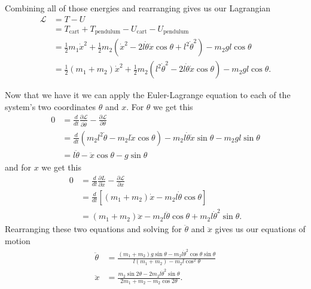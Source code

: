 \documentclass{article}
\begin{document}
Combining all of those energies and rearranging gives us our Lagrangian \begin{align*}
  \mathcal{L} & = T - U                                                                                                                                     \\
              & = T_\text{cart} + T_\text{pendulum} - U_\text{cart} - U_\text{pendulum}                                                                     \\
              & = \frac{1}{2} m_1 \dot{x}^2 + \frac{1}{2} m_2 (\dot{x}^2 - 2 l \dot{\theta} \dot{x} \cos \theta + l^2 \dot{\theta}^2) - m_2 g l \cos \theta \\
              & = \frac{1}{2} (m_1 + m_2) \dot{x}^2 + \frac{1}{2} m_2 (l^2 \dot{\theta}^2 - 2 l \dot{\theta} \dot{x} \cos \theta) - m_2 g l \cos \theta.
\end{align*}

Now that we have it we can apply the Euler-Lagrange equation to each of the system's two coordinates $\theta$ and $x$. For $\theta$ we get this \begin{align*}
  0 & = \frac{d}{d t} \frac{\partial \mathcal{L}}{\partial \dot{\theta}} - \frac{\partial \mathcal{L}}{\partial \theta}                 \\
    & = \frac{d}{d t} (m_2 l^2 \dot{\theta} - m_2 l \dot{x} \cos \theta) - m_2 l \dot{\theta} \dot{x} \sin \theta - m_2 g l \sin \theta \\
    & = l \ddot{\theta} - \ddot{x} \cos \theta - g \sin \theta
\end{align*} and for $x$ we get this \begin{align*}
  0 & = \frac{d}{d t} \frac{\partial L}{\partial \dot{x}} - \frac{\partial \mathcal{L}}{\partial x} \\
    & = \frac{d}{d t} [(m_1 + m_2) \dot{x} - m_2 l \dot{\theta} \cos \theta]                        \\
    & = (m_1 + m_2) \ddot{x} - m_2 l \ddot{\theta} \cos \theta + m_2 l \dot{\theta}^2 \sin \theta.
\end{align*} Rearranging these two equations and solving for $\ddot{\theta}$ and $\ddot{x}$ gives us our equations of motion \begin{align*}
\ddot{\theta} & = \frac{(m_1 + m_2) g \sin \theta - m_2 l \dot{\theta}^2 \cos \theta \sin \theta}{l (m_1 + m_2) - m_2 l \cos^2 \theta} \\
\ddot{x}      & = \frac{m_2 \sin 2 \theta - 2 m_2 l \dot{\theta}^2 \sin \theta}{2 m_1 + m_2 - m_2 \cos 2 \theta}.
\end{align*}
\end{document}
